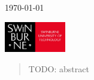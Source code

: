 \begin{titlepage}


  \vfill\vfill\vfill %

  {\large\today} %


  \vfill\vfill
  \includegraphics[width=0.2\textwidth]{../../swin-logo.jpg}\\[1cm] %



\end{titlepage}



\begin{abstract}
  TODO: abstract
\end{abstract}

\newpage


\tableofcontents
\newpage
{}


